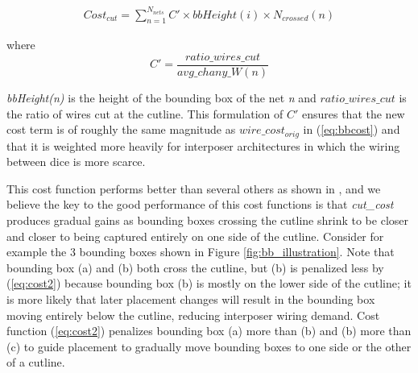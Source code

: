 \documentclass[journal]{IEEEtran}
\begin{document}
\setlength{\arraycolsep}{0.0em}
\begin{multline}
\label{eq:cost2}
Cost_{cut} = \sum_{n=1}^{N_{nets}} C' \times bbHeight(i) \times N_{crossed}(n)
\end{multline}

where 
\setlength{\arraycolsep}{0.0em}
\begin{equation}
\label{eq:cprime}
C' = \frac{ratio\_wires\_cut}{avg\_chany\_W(n)}
\end{equation}
\setlength{\arraycolsep}{5pt}

\textit{bbHeight(n)} is the height of the bounding box of the net \textit{n} and $ratio\_wires\_cut$ is the ratio of wires cut at the cutline. This formulation of $C'$ ensures that the new cost term is of roughly the same magnitude as $wire\_cost_{orig}$ in (\ref{eq:bbcost}) and that it is weighted more heavily for interposer architectures in which the wiring between dice is more scarce.

This cost function performs better than several others as shown in \cite{interposer2014}, and we believe the key to the good performance of this cost functions is that \textit{cut\_cost} produces gradual gains as bounding boxes crossing the cutline shrink to be closer and closer to being captured entirely on one side of the cutline. Consider for example the 3 bounding boxes shown in Figure \ref{fig:bb_illustration}. Note that bounding box (a) and (b) both cross the cutline, but (b) is penalized less by (\ref{eq:cost2}) because bounding box (b) is mostly on the lower side of the cutline; it is more likely that later placement changes will result in the bounding box moving entirely below the cutline, reducing interposer wiring demand. Cost function (\ref{eq:cost2}) penalizes bounding box (a) more than (b) and (b) more than (c) to guide placement to gradually move bounding boxes to one side or the other of a cutline.
\end{document}
